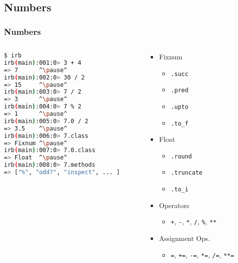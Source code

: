 \subsection{Numbers}
\begin{frame}[fragile]\frametitle{Numbers}

\begin{columns}[c] 

\begin{column}{7cm}
\begin{lstlisting}[language=bash, escapechar={^}]
$ irb
irb(main):001:0> 3 + 4
=> 7      ^\pause^
irb(main):002:0> 30 / 2
=> 15     ^\pause^
irb(main):003:0> 7 / 2
=> 3      ^\pause^
irb(main):004:0> 7 % 2
=> 1      ^\pause^
irb(main):005:0> 7.0 / 2
=> 3.5    ^\pause^
irb(main):006:0> 7.class
=> Fixnum ^\pause^
irb(main):007:0> 7.0.class
=> Float  ^\pause^
irb(main):008:0> 7.methods
=> ["%", "odd?", "inspect", ... ]
\end{lstlisting}
\end{column}

\pause
\begin{column}{4cm}
\begin{itemize}

\item Fixnum
\begin{itemize}
\item \texttt{.succ}
\item \texttt{.pred}
\item \texttt{.upto}
\item \texttt{.to\_f}
\end{itemize}

\item Float
\begin{itemize}
\item \texttt{.round}
\item \texttt{.truncate}
\item \texttt{.to\_i}
\end{itemize}

\item Operators
\begin{itemize}
\item \texttt{+}, \texttt{-}, \texttt{*}, \texttt{/}, \texttt{\%}, \texttt{**} 
\end{itemize}

\item Assignment Ops.
\begin{itemize}
\item \texttt{=}, \texttt{+=}, \texttt{-=}, \texttt{*=}, \texttt{/=}, \texttt{**=} 
\end{itemize}


\end{itemize}
\end{column}

\end{columns}

\end{frame}






